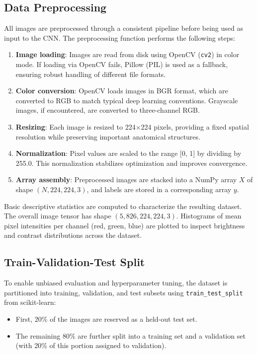 \documentclass[conference]{IEEEtran}
\begin{document}
\subsection{Data Preprocessing}

All images are preprocessed through a consistent pipeline before being used as input to the CNN. The preprocessing function performs the following steps:
\begin{enumerate}
    \item \textbf{Image loading}: Images are read from disk using OpenCV (\texttt{cv2}) in color mode. If loading via OpenCV fails, Pillow (PIL) is used as a fallback, ensuring robust handling of different file formats.
    \item \textbf{Color conversion}: OpenCV loads images in BGR format, which are converted to RGB to match typical deep learning conventions. Grayscale images, if encountered, are converted to three-channel RGB.
    \item \textbf{Resizing}: Each image is resized to 224$\times$224 pixels, providing a fixed spatial resolution while preserving important anatomical structures.
    \item \textbf{Normalization}: Pixel values are scaled to the range [0, 1] by dividing by 255.0. This normalization stabilizes optimization and improves convergence.
    \item \textbf{Array assembly}: Preprocessed images are stacked into a NumPy array $X$ of shape $(N, 224, 224, 3)$, and labels are stored in a corresponding array $y$.
\end{enumerate}

Basic descriptive statistics are computed to characterize the resulting dataset. The overall image tensor has shape $(5{,}826, 224, 224, 3)$. Histograms of mean pixel intensities per channel (red, green, blue) are plotted to inspect brightness and contrast distributions across the dataset.

\subsection{Train-Validation-Test Split}

To enable unbiased evaluation and hyperparameter tuning, the dataset is partitioned into training, validation, and test subsets using \texttt{train\_test\_split} from scikit-learn:
\begin{itemize}
    \item First, 20\% of the images are reserved as a held-out test set.
    \item The remaining 80\% are further split into a training set and a validation set (with 20\% of this portion assigned to validation).
\end{itemize}
\end{document}
